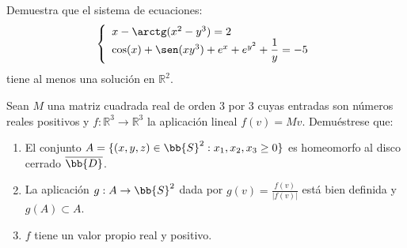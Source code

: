 \begin{ejercicio}
    Demuestra que el sistema de ecuaciones:
    \begin{equation*}
        \left\{\begin{array}{l}
            x-\arctg(x^2-y^3) = 2 \\
            \cos(x) + \sen(xy^3) + e^x + e^{y^2} + \dfrac{1}{y} = -5
        \end{array}\right.
    \end{equation*}
    tiene al menos una solución en $\mathbb{R}^2$.
\end{ejercicio}

\begin{ejercicio}
    Sean $M$ una matriz cuadrada real de orden 3 por 3 cuyas entradas son números reales positivos
    y $f:\mathbb{R}^3\to \mathbb{R}^3$ la aplicación lineal $f(v)=Mv$. Demuéstrese que:
    \begin{enumerate}[label=\alph*)]
        \item El conjunto $A=\{(x,y,z)\in \bb{S}^2:x_1,x_2,x_3\geq 0\}$ es homeomorfo al disco cerrado $\overline{\bb{D}}$.
        \item La aplicación $g:A\to \bb{S}^2$ dada por $g(v) = \frac{f(v)}{|f(v)|}$ está bien definida y $g(A)\subset A$.
        \item $f$ tiene un valor propio real y positivo.
    \end{enumerate}
\end{ejercicio}


